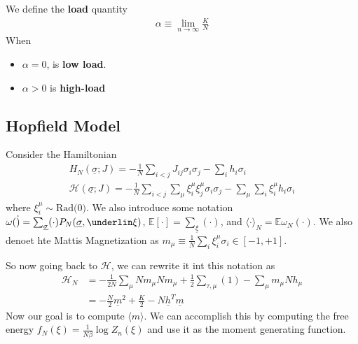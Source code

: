 \begin{definition} [Load] We define the \textbf{load} quantity
	\begin{align}
		\alpha \equiv \lim_{n \to \infty} \frac{K}{N}
	\end{align}When 
	\begin{itemize}
		\item $\alpha = 0$, is \textbf{low load}. 
		\item $\alpha > 0$ is \textbf{high-load}
	\end{itemize}
\end{definition}

\subsection{Hopfield Model} 
Consider the Hamiltonian
\begin{align}
	H_N(\underline \sigma; J) = - \frac{1}{N} \sum_{i < j} J_{ij} \sigma_i \sigma_j - \sum_i h_i \sigma_i\\
	\mathcal H (\underline \sigma; J) = - \frac{1}{N} \sum_{i < j} \sum_\mu \xi_i^\mu \xi_j^\mu \sigma_i \sigma_j - \sum_\mu \sum_i \xi_i^\mu h_i \sigma_i
\end{align}
where $\xi_i^\mu \sim \text{Rad(0)}$. We also introduce some notation $\omega(\dot) = \sum_{\underline \sigma} (\cdot) P_N(\underline \sigma, \underlin \xi)$, $\mathbb E[\cdot] = \sum_{\underline \xi}(\cdot)$, and $\langle \cdot \rangle _N = \mathbb E \omega_N(\cdot)$. We also denoet hte Mattis Magnetization as $m_\mu \equiv \frac{1}{N} \sum_i \xi_i^\mu \sigma_i \in [-1, +1]$.

So now going back to $\mathcal H$, we can rewrite it int this notation as
\begin{align}
	\mathcal H_N & = - \frac{1}{2N} \sum_{\mu} N m_\mu N m_\mu + \frac{1}{2} \sum_{\tau, \mu} (1) - \sum_\mu m_\mu N h_\mu\\
	& = - \frac{N}{2} \underline m^2 + \frac{K}{2} - N \underline h^T \underline m
\end{align}
Now our goal is to compute $\langle m \rangle$. We can accomplish this by computing the free energy $f_N(\xi) = \frac{1}{N\beta} \log Z_n(\xi)$ and use it as the moment generating function.






























